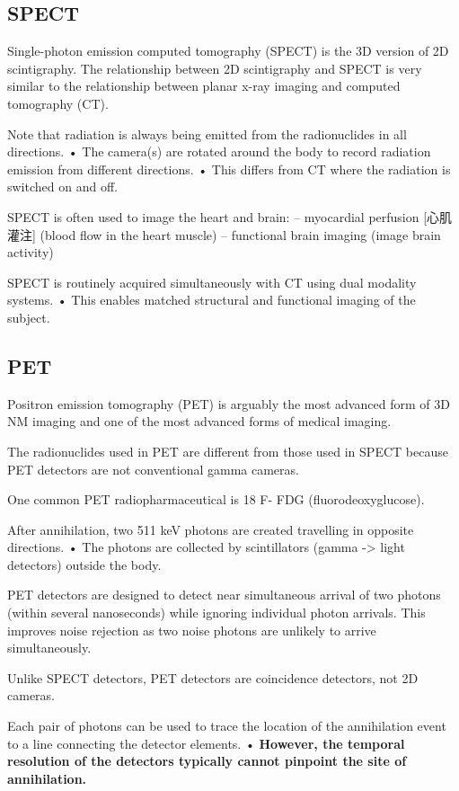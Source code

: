\documentclass[UTF8,a4paper,11pt]{book}
\theoremstyle{mystyle}{
  \newtheorem{example}{Example}
}
\begin{document}
\subsection{SPECT}
Single-photon emission
computed tomography
(SPECT) is the 3D version of
2D scintigraphy.
The relationship between
2D scintigraphy and SPECT
is very similar to the
relationship between
planar x-ray imaging and
computed tomography (CT).

Note that radiation is always being emitted
from the radionuclides in all directions.
• The camera(s) are rotated around the body to
record radiation emission from different
directions.
• This differs from CT where the radiation is
switched on and off.



SPECT is often used to image the heart and
brain:
– myocardial perfusion [心肌灌注] (blood flow in the heart
muscle)
– functional brain imaging (image brain activity)


 SPECT is routinely acquired simultaneously
with CT using dual modality systems.
• This enables matched structural and
functional imaging of the subject.

\subsection{PET}
Positron emission tomography (PET) is
arguably the most advanced form of 3D NM
imaging and one of the most advanced forms
of medical imaging.

The radionuclides used in PET are different
from those used in SPECT because PET
detectors are not conventional gamma
cameras.
 
  One common PET radiopharmaceutical is 18 F-
FDG (fluorodeoxyglucose).

After annihilation, two 511 keV photons are
created travelling in opposite directions.
• The photons are collected by scintillators
(gamma -> light detectors) outside the body.

PET detectors are designed to detect near
simultaneous arrival of two photons (within
several nanoseconds) while ignoring individual
photon arrivals.  This improves noise rejection as two noise
photons are unlikely to arrive simultaneously.

Unlike SPECT detectors, PET detectors are
coincidence detectors, not 2D cameras.

Each pair of photons can be used
to trace the location of the
annihilation event to a line
connecting the detector elements.
• \textbf{However, the temporal resolution
of the detectors typically cannot
pinpoint the site of annihilation.}
\end{document}
